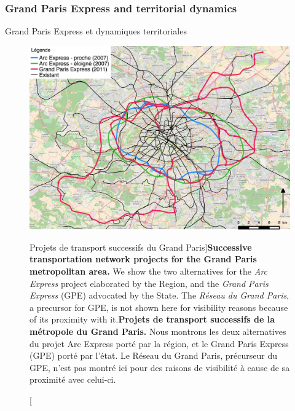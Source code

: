 \subsubsection{Grand Paris Express and territorial dynamics}{Grand Paris Express et dynamiques territoriales}



\begin{figure}[h!]
\includegraphics[width=\linewidth]{Figures/Final/1-2-1-fig-casestudies-projects.jpg}
\caption[][Projets de transport successifs du Grand Paris]{\textbf{Successive transportation network projects for the Grand Paris metropolitan area.} We show the two alternatives for the \emph{Arc Express} project elaborated by the Region, and the \emph{Grand Paris Express} (GPE) advocated by the State. The \emph{Réseau du Grand Paris}, a precursor for GPE, is not shown here for visibility reasons because of its proximity with it.\label{fig:projects}}{\textbf{Projets de transport successifs de la métropole du Grand Paris.} Nous montrons les deux alternatives du projet Arc Express porté par la région, et le Grand Paris Express (GPE) porté par l'état. Le Réseau du Grand Paris, précurseur du GPE, n'est pas montré ici pour des raisons de visibilité à cause de sa proximité avec celui-ci.\label{fig:casestudies:projects}}
\end{figure}





